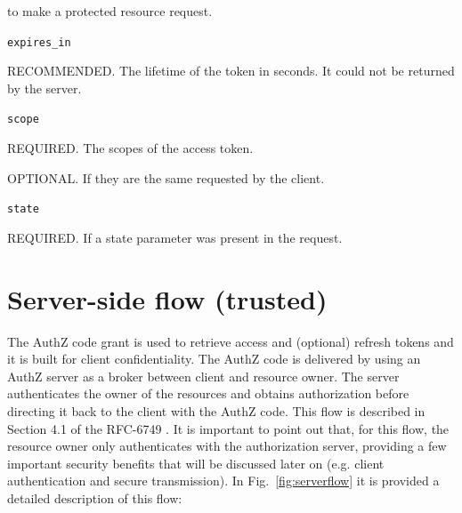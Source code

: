 \hspace{0.5cm}to make a protected resource request.

\texttt{expires\_in}

\hspace{0.5cm}RECOMMENDED. The lifetime of the token in seconds. It could not be returned by the server.

\texttt{scope}

\hspace{0.5cm}REQUIRED. The scopes of the access token.

\hspace{0.5cm}OPTIONAL. If they are the same requested by the client.

\texttt{state}

\hspace{0.5cm}REQUIRED. If a state parameter was present in the request.

\section{Server-side flow (trusted)}
\label{authcg}

The AuthZ code grant is used to retrieve access and (optional) refresh tokens and it is built for client confidentiality. The AuthZ code is delivered by using an AuthZ server as a broker between client and resource owner. The server authenticates the owner of the resources and obtains authorization before directing it back to the client with the AuthZ code. This flow is described in Section 4.1 of the RFC-6749 \cite{RFC6749}. It is important to point out that, for this flow, the resource owner only authenticates with the authorization server, providing a few important security benefits that will be discussed later on (e.g. client authentication and secure transmission). In Fig.~\ref{fig:serverflow} it is provided a detailed description of this flow:

